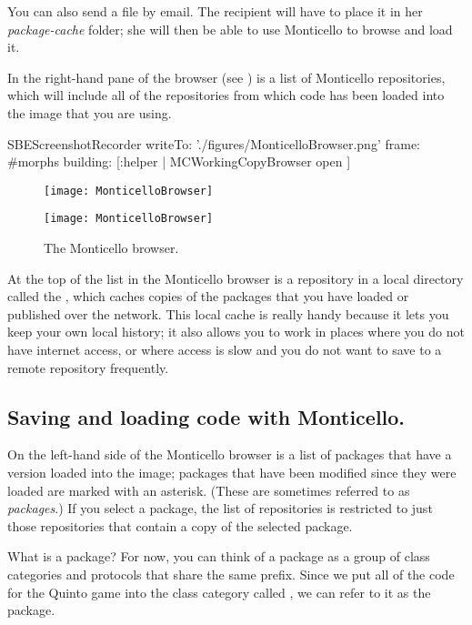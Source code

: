 \documentclass[a4paper,10pt,twoside]{book}
\begin{document}
You can also send a  file by email.
The recipient will have to place it in her \emph{package-cache} folder; she will then be able to use Monticello to browse and load it.

In the right-hand pane of the browser (see ) is a list of Monticello repositories, which will include all of the repositories from which code has been loaded into the image that you are using.

\begin{ExecuteSmalltalkScript}
SBEScreenshotRecorder writeTo: './figures/MonticelloBrowser.png' frame: #morphs building: [:helper |
  MCWorkingCopyBrowser open
]
\end{ExecuteSmalltalkScript}
\begin{figure}[hbt]
\ifluluelse
	{\centerline {\texttt{[image: MonticelloBrowser]}}}
	{\centerline {\texttt{[image: MonticelloBrowser]}}}
\caption{The Monticello browser.
\label{fig:monticello1}}
\end{figure}

At the top of the list in the Monticello browser is a repository in a local directory called the , which caches copies of the packages that you have loaded or published over the network.
This local cache is really handy because it lets you keep your own local history; it also allows you to work in places where you do not have internet access, or where access is slow and you do not want to save to a remote repository frequently.


\subsection{Saving and loading code with Monticello.}
On the left-hand side of the Monticello browser is a list of packages that have a version loaded into the image; packages that have been modified since they were loaded are marked with an asterisk.
(These are sometimes referred to as \emph{ packages}.)
If you select a package, the list of repositories is restricted to just those repositories that contain a copy of the selected package.

What is a package?
For now, you can think of a package as a group of class categories and protocols that share the same prefix.
Since we put all of the code for the Quinto game into the class category called , we can refer to it as the  package.
\end{document}
